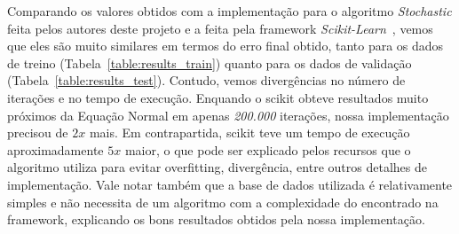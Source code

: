\documentclass[conference]{IEEEtran}
\begin{document}
\begin{table}[H]
\centering
{}
\caption{Tabela de Resultados de Treino Para Cada Algoritmo}
\label{table:results_train}
\end{table}

\vspace{-2em}

\begin{table}[H]
\centering
{}
	\caption{Tabela de Resultados de Validação Para Os Algoritmos Mais Eficientes}
\label{table:results_test}
\end{table}

Comparando os valores obtidos com a implementação para o algoritmo \textit{Stochastic} feita pelos autores deste projeto e a feita pela framework \textit{Scikit-Learn}~\cite{scikit}, vemos que eles são muito similares em termos do erro final obtido, tanto para os dados de treino (Tabela~\ref{table:results_train}) quanto para os dados de validação (Tabela~\ref{table:results_test}). Contudo, vemos divergências no número de iterações e no tempo de execução. Enquando o scikit obteve resultados muito próximos da Equação Normal em apenas \textit{200.000} iterações, nossa implementação precisou de $2x$ mais. Em contrapartida, scikit teve um tempo de execução aproximadamente $5x$ maior, o que pode ser explicado pelos recursos que o algoritmo utiliza para evitar overfitting, divergência, entre outros detalhes de implementação. Vale notar também que a base de dados utilizada é relativamente simples e não necessita de um algoritmo com a complexidade do encontrado na framework, explicando os bons resultados obtidos pela nossa implementação.
\end{document}
